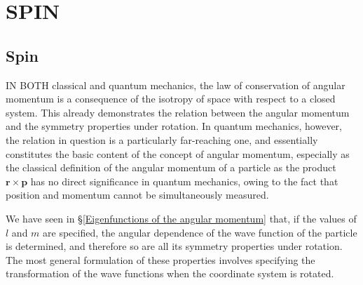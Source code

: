 \chapter{SPIN}\label{SPIN}
\section{Spin}\label{Spin}
IN BOTH classical and quantum mechanics, the law of conservation of angular momentum is a consequence of the isotropy of space with respect to a closed system. This already demonstrates the relation between the angular momentum and the symmetry properties under rotation. In quantum mechanics, however, the relation in question is a particularly far-reaching one, and essentially constitutes the basic content of the concept of angular momentum, especially as the classical definition of the angular momentum of a particle as the product $ \bm{r}\times\bm{p} $ has no direct significance in quantum mechanics, owing to the fact that position and momentum cannot be simultaneously measured.

We have seen in \S\ref{Eigenfunctions of the angular momentum} that, if the values of $ l $ and $ m $ are specified, the angular dependence of the wave function of the particle is determined, and therefore so are all its symmetry properties under rotation. The most general formulation of these properties involves specifying the transformation of the wave functions when the coordinate system is rotated.

